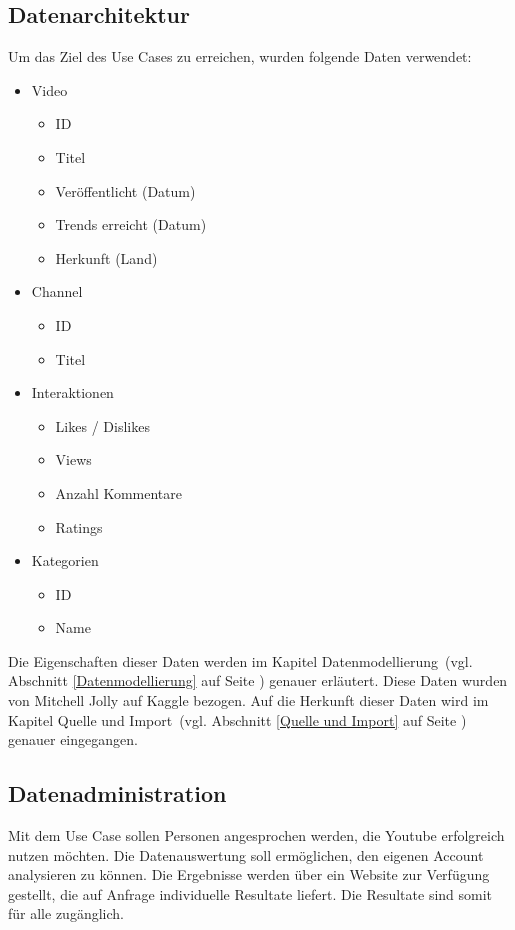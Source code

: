 \documentclass[12pt,titlepage]{article}
\begin{document}
\newpage

\subsection{Datenarchitektur}
Um das Ziel des Use Cases zu erreichen, wurden folgende Daten verwendet:
\begin{itemize}
\item Video
\begin{itemize}
\item ID
\item Titel
\item Veröffentlicht (Datum)
\item Trends erreicht (Datum)
\item Herkunft (Land)
\end{itemize}
\item Channel
\begin{itemize}
\item ID
\item Titel
\end{itemize}
\item Interaktionen
\begin{itemize}
\item Likes / Dislikes
\item Views
\item Anzahl Kommentare
\item Ratings
\end{itemize}
\item Kategorien
\begin{itemize}
\item ID
\item Name
\end{itemize}
\end{itemize}

Die Eigenschaften dieser Daten werden im Kapitel \glqq Datenmodellierung\grqq\, (vgl. Abschnitt \ref{Datenmodellierung} auf Seite \pageref{Datenmodellierung}) genauer erläutert. Diese Daten wurden von Mitchell Jolly auf Kaggle  bezogen. Auf die Herkunft dieser Daten wird im Kapitel \glqq Quelle und Import\grqq\, (vgl. Abschnitt \ref{Quelle und Import} auf Seite \pageref{Quelle und Import}) genauer eingegangen.
\newpage

\subsection{Datenadministration}
Mit dem Use Case sollen Personen angesprochen werden, die Youtube erfolgreich nutzen möchten. Die Datenauswertung soll ermöglichen, den eigenen Account analysieren zu können. Die Ergebnisse werden über ein Website zur Verfügung gestellt, die auf Anfrage individuelle Resultate liefert. Die Resultate sind somit für alle zugänglich. 
\end{document}
